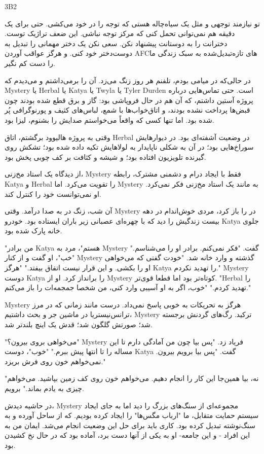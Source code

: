 3B2

تو نیازمند توجهی و مثل یک سیاه‌چاله هستی که توجه را در خود می‌کشی.
حتی برای یک دقیقه هم نمی‌توانی تحمل کنی که مرکز توجه نباشی. این ضعف
تراژیک توست. دخترانت را به دوستانت پیشنهاد نکن. سعی نکن یک دختر مهمانی
را تبدیل به دوست‌دختر خود کنی. و هرگز عواقب آوردن AFCهای تازه‌تبدیل‌شده
به سبک زندگی ما را دست کم نگیر.

در حالی‌که در میامی بودم، تلفنم هر روز زنگ می‌زد. آن را برمی‌داشتم و
می‌دیدم که Mystery یا Herbal یا Katya یا Twyla یا Tyler Durden است.
حتی تماس‌هایی درباره پروژه آستین داشتم، که آن هم در حال فروپاشی بود:
گاز و برق قطع شده بودند چون قبض‌ها پرداخت نشده بودند، و اتاق‌خواب‌ها
با شمع، لباس‌های کثیف و پورنوگرافی پُر شده بود. اما تنها کسی که واقعاً
می‌خواستم صدایش را بشنوم، لیزا بود.

وقتی به پروژه هالیوود برگشتم، اتاق Herbal در وضعیت آشفته‌ای بود.
در دیوارهایش سوراخ‌هایی بود؛ در آن به شکلی ناپایدار به لولاهایش تکیه
داده شده بود؛ تشکش روی گیرنده تلویزیون افتاده بود؛ و شیشه و کثافت
بر کف چوبی پخش بود.

از دیدگاه یک استاد مخ‌زنی، Mystery فقط با ایجاد درام و دشمنی مشترک،
رابطه Katya و Herbal را تقویت می‌کرد. اما Mystery به مانند یک استاد
مخ‌زنی فکر نمی‌کرد. او نمی‌توانست خود را کنترل کند.

آن شب، زنگ در به صدا درآمد. وقتی Mystery در را باز کرد، مردی خوش‌اندام
در دهه بیست زندگیش را دید که با چهره‌ای عصبانی زیر باران ایستاده بود. خودرو
Katya جلوی خانه پارک شده بود.

"من برادر Katya هستم"، مرد به Mystery گفت.
"فکر نمی‌کنم. برادر او را می‌شناسم."
"خب"، او گفت و از کنار Mystery گذشته و وارد خانه شد. "خودت گفتی که
می‌خواهی او را بکشی. و این قرار نیست اتفاق بیفتد."
"هرگز Katya را تهدید نکردم." Mystery دوست Katya را برانداز کرد. او از
Mystery کوتاه‌تر بود اما قطعا قوی‌تر. "Herbal را تهدید کردم."
"خوب، اگر به او آسیبی وارد کنی، من شخصا جمجمه‌ات را باز می‌کنم."

Mystery هرگز به تحریکات به خوبی پاسخ نمی‌داد. درست مانند زمانی که
در مرز ترانس‌نیستریا در ماشین جر و بحث داشتیم، Mystery ترکید. رگ‌های
گردنش برجسته شد؛ صورتش گلگون شد؛ قدش یک اینچ بلندتر شد.

"می‌خواهی بروی بیرون؟" Mystery فریاد زد. "پس بیا چون من آمادگی
دارم تا این مساله را تا انتها پیش ببرم."
"خوب"، دوست Katya گفت. "پس بیا برویم بیرون. نمی‌خواهم خون روی
فرش بریزد."

"نه، بیا همین‌جا این کار را انجام دهیم. می‌خواهم خون روی کف زمین
بپاشید. می‌خواهم چیزی به یادم بماند." برویم.

در حاشیه دیدش، Mystery مجموعه‌ای از سنگ‌های بزرگ را دید
اما به جای ایجاد سیستم حمایت متقابل، ما "ارباب مگس‌ها" را ایجاد کرده بودیم. 
که از ساحل آورده و به سنگ‌نوشته تبدیل کرده بود. 
کاری باید برای حل این وضعیت انجام می‌شد. ایمان من به این افراد - و این جامعه-
او به یکی از آنها دست برد، آماده بود که 
در حال نخ کشیدن بود.

